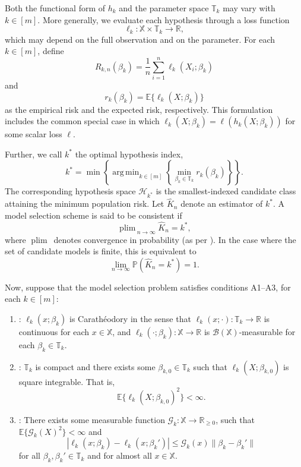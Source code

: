 \documentclass[12pt]{article}
\DeclareMathOperator*{\argmin}{arg\,min}
\DeclareMathOperator*{\plim}{plim\,}
\theoremstyle{remark}
\theoremstyle{plain}
\begin{document}
Both the functional form of $h_k$ and the parameter space $\mathbb T_k$ may vary with $k\in[m]$. More generally, we evaluate each hypothesis through a loss function
\[
\ell_k:\mathbb{X}\times\mathbb{T}_k\to\mathbb{R},
\]
which may depend on the full observation and on the parameter. For each $k \in \left[m\right]$, define
\[R_{k,n}(\beta_k) = \frac{1}{n} \sum_{i=1}^n \ell_k(X_i; \beta_k)\]
and
\[r_k(\beta_k) = \mathbb{E} \{\ell_k(X; \beta_k)\}\]
as the empirical risk and the expected risk, respectively. This formulation includes the common special case in which $\ell_k(X;\beta_k)=\ell(h_k(X;\beta_k))$ for some scalar loss $\ell$.

Further, we call $k^*$ the optimal hypothesis index,
\begin{equation}\label{Eqs: Optimal hypothesis index}
    k^* = \min\left\{\argmin_{k \in \left[m\right]} \left\{\min_{\beta_k \in \mathbb{T}_k}r_k(\beta_k)\right\}\right\}.
\end{equation}
The corresponding hypothesis space $\mathcal{H}_{k^*}$ is the smallest-indexed candidate class attaining the minimum population risk. Let $\hat{K}_n$ denote an estimator of $k^*$. A model selection scheme is said to be consistent if
\begin{equation} \label{Eqs: Consistency}
    \plim_{n\to\infty} \hat{K}_n = k^*,
\end{equation}
where $\plim$ denotes convergence in probability (as per \citealp[Sec. 3.2]{amemiya1985advanced}). In the case where the set of candidate models is finite, this is equivalent to
\begin{equation}\label{Eqs: Probability Limit}
    \lim_{n\to\infty}\mathbb{P}\left(\hat{K}_n = k^*\right) = 1.
\end{equation}

Now, suppose that the model selection problem satisfies conditions A1--A3, for each $k \in \left[m\right]$:
\begin{enumerate}
    \item[A1]: $\ell_k(x; \beta_k)$ is Carath\'{e}odory in the sense that $\ell_k(x; \cdot): \mathbb{T}_k \to \mathbb{R}$ is continuous for each $x\in \mathbb{X}$, and $\ell_k(\cdot; \beta_k): \mathbb{X} \to \mathbb{R}$ is $\mathcal{B}(\mathbb{X})$-measurable for each $\beta_k\in\mathbb{T}_k$.
    \item[A2]: $\mathbb{T}_k$ is compact and there exists some $\beta_{k,0}\in\mathbb{T}_k$ such that $\ell_k(X; \beta_{k,0})$ is square integrable. That is,
    \[\mathbb{E}\{\ell_k(X;\beta_{k,0})^2\} < \infty.\]
    \item[A3]: There exists some measurable function $\mathcal{G}_k:\mathbb{X}\to \mathbb{R}_{\geq 0}$, such that $\mathbb{E}\{\mathcal{G}_k(X)^2\} < \infty$ and
    \[
    |\ell_k(x; \beta_k) - \ell_k(x;\beta_k')| \leq \mathcal{G}_k(x) \lVert \beta_k - \beta_k'\rVert
    \]
    for all $\beta_k,\beta_k' \in \mathbb{T}_k$ and for almost all $x\in\mathbb{X}$.
\end{enumerate}
\end{document}

